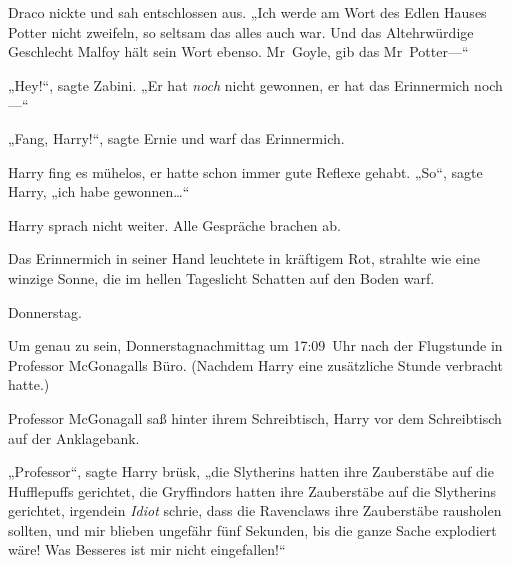 Draco nickte und sah entschlossen aus. „Ich werde am Wort des Edlen Hauses Potter nicht zweifeln, so seltsam das alles auch war. Und das Altehrwürdige Geschlecht Malfoy hält sein Wort ebenso. Mr~Goyle, gib das Mr~Potter—“

„Hey!“, sagte Zabini. „Er hat \emph{noch} nicht gewonnen, er hat das Erinnermich noch—“

„Fang, Harry!“, sagte Ernie und warf das Erinnermich.

Harry fing es mühelos, er hatte schon immer gute Reflexe gehabt. „So“, sagte Harry, „ich habe gewonnen…“

Harry sprach nicht weiter. Alle Gespräche brachen ab.

Das Erinnermich in seiner Hand leuchtete in kräftigem Rot, strahlte wie eine winzige Sonne, die im hellen Tageslicht Schatten auf den Boden warf.

\later

Donnerstag.

Um genau zu sein, Donnerstagnachmittag um 17:09~Uhr nach der Flugstunde in Professor McGonagalls Büro. (Nachdem Harry eine zusätzliche Stunde verbracht hatte.)

Professor McGonagall saß hinter ihrem Schreibtisch, Harry vor dem Schreibtisch auf der Anklagebank.

„Professor“, sagte Harry brüsk, „die Slytherins hatten ihre Zauberstäbe auf die Hufflepuffs gerichtet, die Gryffindors hatten ihre Zauberstäbe auf die Slytherins gerichtet, irgendein \emph{Idiot} schrie, dass die Ravenclaws ihre Zauberstäbe rausholen sollten, und mir blieben ungefähr fünf Sekunden, bis die ganze Sache explodiert wäre! Was Besseres ist mir nicht eingefallen!“


